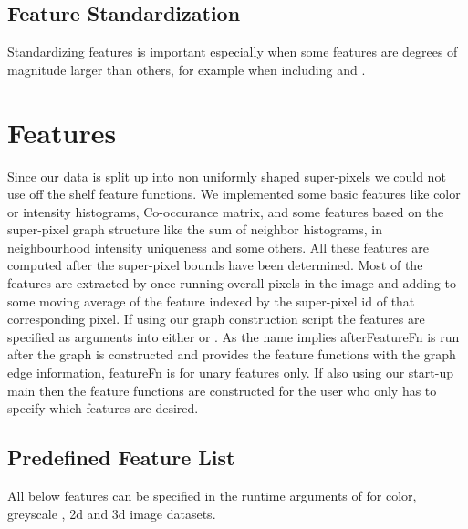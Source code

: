 \subsection{Feature Standardization}
Standardizing features is important especially when some features are degrees of magnitude larger than others, for example when including  and . 




\section{Features}
Since our data is split up into non uniformly shaped super-pixels we could not use off the shelf feature functions. We implemented some basic features like color or intensity histograms, Co-occurance matrix, and some features based on the super-pixel graph structure like the sum of neighbor histograms, in neighbourhood intensity uniqueness and some others. All these features are computed after the super-pixel bounds have been determined. Most of the features are extracted by once running overall pixels in the image and adding to some moving average of the feature indexed by the super-pixel id of that corresponding pixel. If using our graph construction script  the features are specified as arguments into either  or . As the name implies afterFeatureFn is run after the graph is constructed and provides the feature functions with the graph edge information, featureFn is for unary features only. If also using our start-up main  then the feature functions are constructed for the user who only has to specify which features are desired. 
\subsection{Predefined Feature List}
All below features can be specified in the runtime arguments of  for color, greyscale , 2d and 3d image datasets. 

